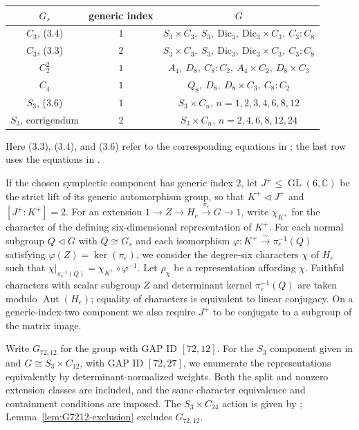 \documentclass[12pt]{amsart}
\numberwithin{equation}{section}
\theoremstyle{plain}
\theoremstyle{definition}
\theoremstyle{remark}
\newcommand{\CC}{\mathbb C}
\DeclareMathOperator{\Aut}{Aut}
\DeclareMathOperator{\GL}{GL}
\begin{document}
\begin{center}
\begin{tabular}{c|c|c}
$G_s$ & generic index & $G$ \\ \hline
$C_3$, (3.4) & $1$ & $S_3\times C_3,\ S_3,\ \mathrm{Dic}_3,\ \mathrm{Dic}_3\times C_3,\ C_3:C_8$ \\
$C_3$, (3.3) & $2$ & $S_3\times C_3,\ S_3,\ \mathrm{Dic}_3,\ \mathrm{Dic}_3\times C_3,\ C_3:C_8$ \\
$C_2^2$ & $1$ & $A_4,\ D_8,\ C_8:C_2,\ A_4\times C_2,\ D_8\times C_3$ \\
$C_4$ & $1$ & $Q_8,\ D_8,\ D_8\times C_3,\ C_8:C_2$ \\
$S_3$, (3.6) & $1$ & $S_3\times C_n$, $n=1,2,3,4,6,8,12$ \\
$S_3$, corrigendum & $2$ & $S_3\times C_n$, $n=2,4,6,8,12,24$
\end{tabular}
\end{center}
Here (3.3), (3.4), and (3.6) refer to the corresponding equations in
\cite[\S3]{KOIKE202512}; the last row uses the equations in
\cite{KOIKE2026}.

If the chosen symplectic component has generic index $2$, let
$J^+\leq\GL(6,\CC)$ be the strict lift of its generic automorphism group, so that
$K^+\triangleleft J^+$ and $[J^+:K^+]=2$.  For an extension
$1\to Z\to H_e\xrightarrow{\pi_e}G\to1$, write $\chi_{K^+}$ for the
character of the defining six-dimensional representation of $K^+$.  For
each normal subgroup $Q\triangleleft G$ with $Q\cong G_s$ and each
isomorphism $\varphi:K^+\xrightarrow{\sim}\pi_e^{-1}(Q)$ satisfying
$\varphi(Z)=\ker(\pi_e)$, we consider the degree-six characters $\chi$ of
$H_e$ such that
$\chi|_{\pi_e^{-1}(Q)}=\chi_{K^+}\circ\varphi^{-1}$.  Let $\rho_\chi$ be a representation
affording $\chi$.  Faithful characters with scalar subgroup $Z$ and determinant
kernel $\pi_e^{-1}(Q)$ are taken modulo $\Aut(H_e)$; equality of characters
is equivalent to linear conjugacy.  On a generic-index-two component we
also require $J^+$ to be conjugate to a subgroup of the matrix image.

Write $G_{72,12}$ for the group with GAP ID $[72,12]$.  For the
$S_3$ component given in \cite{KOIKE2026} and $G\cong S_3\times C_{12}$, with GAP ID $[72,27]$, we
enumerate the representations equivalently by determinant-normalized
weights.  Both the split and nonzero extension classes are included, and
the same character equivalence and containment conditions are imposed.
The $S_3\times C_{24}$ action is given by
\cite[Proposition~7.1]{FWZ26}; Lemma~\ref{lem:G7212-exclusion}
excludes $G_{72,12}$.
\end{document}
